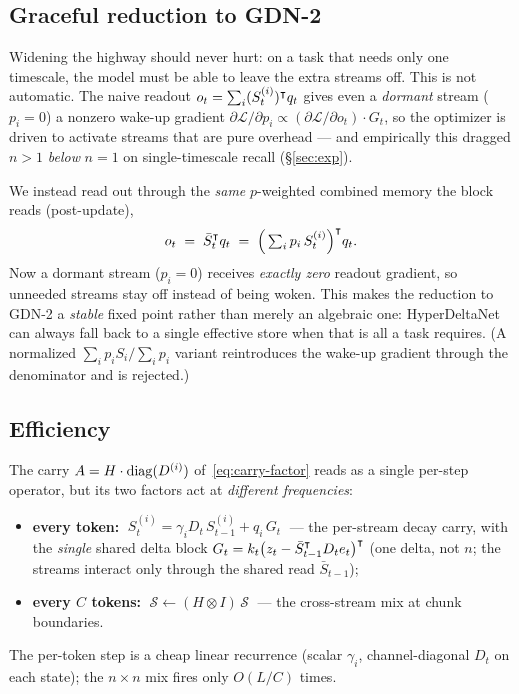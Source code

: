 \documentclass[11pt,letterpaper,logo]{yalearxiv}
\newcommand{\Sbb}{\boldsymbol{\mathcal{S}}}    %
\begin{document}
\subsection{Graceful reduction to GDN-2}
Widening the highway should never hurt: on a task that needs only one timescale,
the model must be able to leave the extra streams off. This is not automatic. The
naive readout $o_t = \sum_i (S_t^{(i)})^{\intercal} q_t$ gives even a \emph{dormant}
stream ($p_i = 0$) a nonzero wake-up gradient $\partial \mathcal{L}/\partial p_i
\propto (\partial \mathcal{L}/\partial o_t)\cdot G_t$, so the optimizer is driven
to activate streams that are pure overhead --- and empirically this dragged $n>1$
\emph{below} $n=1$ on single-timescale recall (\S\ref{sec:exp}).

We instead read out through the \emph{same} $p$-weighted combined memory the block
reads (post-update),
\begin{equation}
  o_t \;=\; \bar S_t^{\intercal} q_t \;=\; \Big(\textstyle\sum_i p_i\, S_t^{(i)}\Big)^{\intercal} q_t .
  \label{eq:readout}
\end{equation}
Now a dormant stream ($p_i = 0$) receives \emph{exactly zero} readout gradient, so
unneeded streams stay off instead of being woken. This makes the reduction to
GDN-2 a \emph{stable} fixed point rather than merely an algebraic one: HyperDeltaNet
can always fall back to a single effective store when that is all a task requires.
(A normalized $\sum_i p_i S_i / \sum_i p_i$ variant reintroduces the wake-up
gradient through the denominator and is rejected.)

\subsection{Efficiency}
The carry $A = H\cdot\operatorname{diag}(D^{(i)})$ of~\eqref{eq:carry-factor} reads as a single
per-step operator, but its two factors act at \emph{different frequencies}:
\begin{itemize}[leftmargin=1.5em,itemsep=1pt,topsep=2pt]
  \item \textbf{every token:} $\;S_t^{(i)} = \gamma_i D_t\, S_{t-1}^{(i)} + q_i\, G_t\;$
  --- the per-stream decay carry, with the \emph{single} shared delta block
  $G_t = k_t\big(z_t - \bar S_{t-1}^{\intercal} D_t e_t\big)^{\intercal}$ (one delta, not $n$;
  the streams interact only through the shared read $\bar S_{t-1}$);
  \item \textbf{every $C$ tokens:} $\;\Sbb \leftarrow (H \otimes I)\,\Sbb\;$
  --- the cross-stream mix at chunk boundaries.
\end{itemize}
The per-token step is a cheap linear recurrence (scalar $\gamma_i$, channel-diagonal
$D_t$ on each state); the $n\times n$ mix fires only $O(L/C)$ times.
\end{document}
